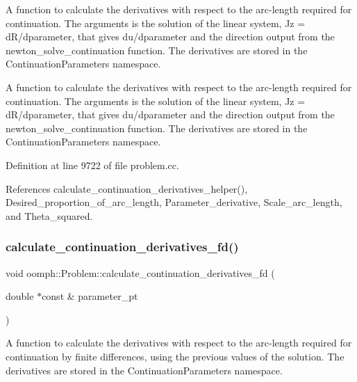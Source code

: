 A function to calculate the derivatives with respect to the arc-\/length required for continuation. The arguments is the solution of the linear system, Jz = d\+R/dparameter, that gives du/dparameter and the direction output from the newton\+\_\+solve\+\_\+continuation function. The derivatives are stored in the Continuation\+Parameters namespace. 

A function to calculate the derivatives with respect to the arc-\/length required for continuation. The arguments is the solution of the linear system, Jz = d\+R/dparameter, that gives du/dparameter and the direction output from the newton\+\_\+solve\+\_\+continuation function. The derivatives are stored in the Continuation\+Parameters namespace. 

Definition at line 9722 of file problem.\+cc.



References calculate\+\_\+continuation\+\_\+derivatives\+\_\+helper(), Desired\+\_\+proportion\+\_\+of\+\_\+arc\+\_\+length, Parameter\+\_\+derivative, Scale\+\_\+arc\+\_\+length, and Theta\+\_\+squared.

\mbox{\label{classoomph_1_1Problem_addc838287129a35ef60e38ea854b939c}} 
\subsubsection{\texorpdfstring{calculate\+\_\+continuation\+\_\+derivatives\+\_\+fd()}{calculate\_continuation\_derivatives\_fd()}}
{\footnotesize\ttfamily void oomph\+::\+Problem\+::calculate\+\_\+continuation\+\_\+derivatives\+\_\+fd (\begin{DoxyParamCaption}\item[{double $\ast$const \&}]{parameter\+\_\+pt }\end{DoxyParamCaption})\hspace{0.3cm}{\ttfamily [protected]}}



A function to calculate the derivatives with respect to the arc-\/length required for continuation by finite differences, using the previous values of the solution. The derivatives are stored in the Continuation\+Parameters namespace. 

